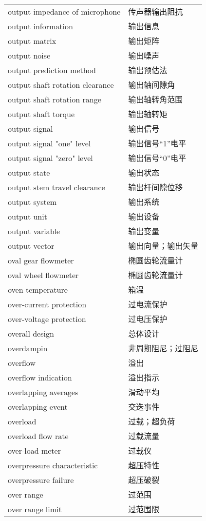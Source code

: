 \documentclass[
]{article}
\begin{document}
\begin{longtable}[]{@{}ll@{}}
output impedance of microphone & 传声器输出阻抗 \\
output information & 输出信息 \\
output matrix & 输出矩阵 \\
output noise & 输出噪声 \\
output prediction method & 输出预估法 \\
output shaft rotation clearance & 输出轴间隙角 \\
output shaft rotation range & 输出轴转角范围 \\
output shaft torque & 输出轴转矩 \\
output signal & 输出信号 \\
output signal "one" level & 输出信号``1''电平 \\
output signal "zero" level & 输出信号``0''电平 \\
output state & 输出状态 \\
output stem travel clearance & 输出杆间隙位移 \\
output system & 输出系统 \\
output unit & 输出设备 \\
output variable & 输出变量 \\
output vector & 输出向量；输出矢量 \\
oval gear flowmeter & 椭圆齿轮流量计 \\
oval wheel flowmeter & 椭圆齿轮流量计 \\
oven temperature & 箱温 \\
over-current protection & 过电流保护 \\
over-voltage protection & 过电压保护 \\
overall design & 总体设计 \\
overdampin & 非周期阻尼；过阻尼 \\
overflow & 溢出 \\
overflow indication & 溢出指示 \\
overlapping averages & 滑动平均 \\
overlapping event & 交迭事件 \\
overload & 过载；超负荷 \\
overload flow rate & 过载流量 \\
over-load meter & 过载仪 \\
overpressure characteristic & 超压特性 \\
overpressure failure & 超压破裂 \\
over range & 过范围 \\
over range limit & 过范围限 \\

\end{longtable}
\end{document}
